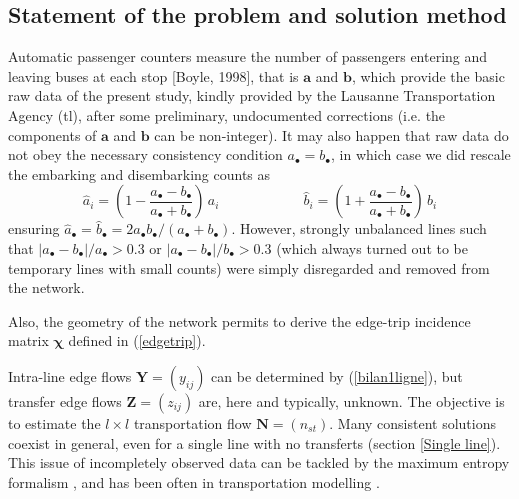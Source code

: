 \documentclass{bmcart}
\begin{document}
\subsection{Statement of the problem and solution method}
Automatic passenger counters measure the number of passengers entering and leaving buses at each stop [Boyle, 1998], that is $\mathbf{a}$ and $\mathbf{b}$, which provide the basic raw data of the present study, kindly provided by the Lausanne Transportation Agency (tl), after some preliminary, undocumented corrections (i.e. the components of $\mathbf{a}$ and $\mathbf{b}$ can be non-integer). It may also happen that raw data do not obey the necessary consistency condition  $a_\bullet=b_\bullet$, in which case we did rescale the embarking and disembarking counts as 
\begin{displaymath}
\hat{a}_i=(1-\frac{a_\bullet-b_\bullet}{a_\bullet+b_\bullet})\, a_i 
 \qquad\qquad\qquad
  \hat{b}_i=(1+\frac{a_\bullet-b_\bullet}{a_\bullet+b_\bullet})\,  b_i 
\end{displaymath}
ensuring $\hat{a}_\bullet=\hat{b}_\bullet=2a_\bullet b_\bullet/(a_\bullet+b_\bullet)$. However, strongly unbalanced lines such that  $|a_\bullet-b_\bullet|/a_\bullet > 0.3$ or $|a_\bullet-b_\bullet|/b_\bullet > 0.3$  (which always turned out to be temporary lines with small  counts) were simply disregarded and removed from the network. 

Also, the geometry of the network permits to derive the edge-trip incidence matrix $\bm{\chi}$ defined in (\ref{edgetrip}). 


Intra-line edge flows $\mathbf{Y}=(y_{ij})$ can be determined by (\ref{bilan1ligne}), but transfer edge flows $\mathbf{Z}=(z_{ij})$ are, here and typically, unknown. The objective is to estimate the $l\times l$ transportation flow $\mathbf{N}=(n_{st})$. Many consistent solutions coexist in general, even for a single line with no transferts (section \ref{Single line}). This issue of incompletely observed data can be tackled by the maximum entropy formalism \cite{jaynes1957information}, and has been often  in transportation modelling \cite{wilson1967statistical}  \cite{erlander1990gravity}. 
\end{document}

